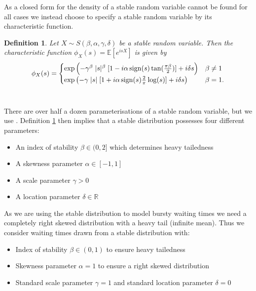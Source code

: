\documentclass[honours,12pt]{UNSWthesis}
\newcommand{\R}{\mathbb{R}}
\newcommand{\E}{\mathbb{E}}
\newcommand{\1}{\mathbf 1}
\newcommand{\sign}{\mathop{\rm sign}}
\newtheorem{definition}[theorem]{Definition}
\numberwithin{equation}{section}
\theoremstyle{definition}
\theoremstyle{remark}
\begin{document}
\noindent As a closed form for the density of a stable random variable cannot be found for all cases we instead choose to specify a stable random variable by its characteristic function.\\
\begin{definition}\label{def:stableChar}
Let $X\sim S(\beta,\alpha,\gamma,\delta)$ be a stable random variable. Then the characteristic function $\phi_X(s)=\E[e^{isX}]$ is given by
\begin{align}
	\phi_X(s)=\begin{cases}
			\exp\left(-\gamma^\beta \; |s|^\beta \; [1-i\alpha \sign(s)\tan(\frac{\pi\beta}{2})]+i\delta s\right) &\beta\neq1\\
			\exp\left(-\gamma \; |s| \; [1+i\alpha \sign(s)\frac{2}{\pi}\log(s)]+i\delta s\right) &\beta=1.
			\end{cases} 
\end{align}\\
\end{definition}

\noindent There are over half a dozen parameterisations of a stable random variable, 
but we use \cite[Def~1.1.6]{Samorodnitsky1994}. Definition \ref{def:stableChar} then implies that a stable distribution possesses four different parameters:
\begin{itemize}
	\item An index of stability $\beta \in (0,2]$ which determines heavy tailedness 
	\item A skewness parameter $\alpha \in [-1,1]$
	\item A scale parameter $\gamma > 0$
	\item A location parameter $\delta \in \R$\\
\end{itemize}

\noindent As we are using the stable distribution to model bursty waiting times we need a completely right skewed distribution with a heavy tail (infinite mean). Thus we consider waiting times drawn from a stable distribution with:
\begin{itemize}
	\item Index of stability $\beta \in (0,1)$ to ensure heavy tailedness
	\item Skewness parameter $\alpha=1$ to ensure a right skewed distribution
	\item Standard scale parameter $\gamma=1$ and standard location parameter $\delta=0$\\
\end{itemize}
\end{document}
